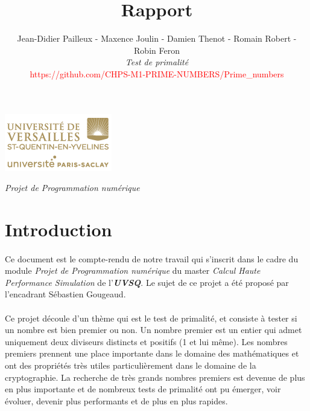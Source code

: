 

\title{\vspace{\fill}\textbf{\Huge Rapport}}
\author{Jean-Didier Pailleux - Maxence Joulin - Damien Thenot - Romain Robert - Robin Feron 
	\vspace{2em}\\
	\textit{Test de primalité}\\
	\textcolor{red}{https://github.com/CHPS-M1-PRIME-NUMBERS/Prime\_numbers}
	\vspace{2em}
}


\clearpage
\maketitle\vspace{13em}
\begin{center}\includegraphics[scale=0.7]{logo.png}\end{center}
\begin{flushright}\textit{Projet de Programmation numérique}\end{flushright}
\newpage
\tableofcontents
\newpage\clearpage{}

	\section{Introduction}
	\paragraph{}Ce document est le compte-rendu de notre travail qui s'inscrit dans le cadre du module \textit{Projet de Programmation numérique} du master \textit{Calcul Haute Performance Simulation} de l'\textit{\textbf{UVSQ}}. Le sujet de ce projet a été proposé par l'encadrant Sébastien Gougeaud.
	
	\paragraph{}Ce projet découle d'un thème qui est le test de primalité, et consiste à tester si un nombre est bien premier ou non. Un nombre premier est un entier qui admet uniquement deux diviseurs distincts et positifs (1 et lui même). 
	Les nombres premiers prennent une place importante dans le domaine des mathématiques et ont des propriétés très utiles particulièrement dans le domaine de la cryptographie. La recherche de très grands nombres premiers est devenue de plus en plus importante et de nombreux tests de primalité ont pu émerger, voir évoluer, devenir plus performants et de plus en plus rapides.
	
